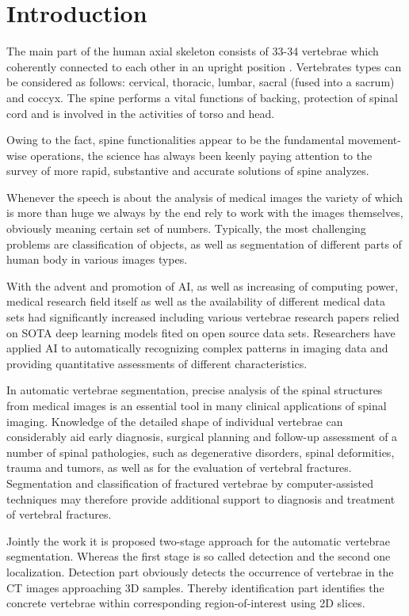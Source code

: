\chapter{Introduction}
\label{ch:introduction}


The main part of the human axial skeleton consists of 33-34 vertebrae which coherently connected to each other in an upright position \cite{Ahlberg2005}. Vertebrates types can be considered as follows: cervical, thoracic, lumbar, sacral (fused into a sacrum) and coccyx. The spine performs a vital functions of backing, protection of spinal cord and is involved in the activities of torso and head.

Owing to the fact, spine functionalities appear to be the fundamental movement-wise operations, the science has always been keenly paying attention to the survey of more rapid, substantive and accurate solutions of spine analyzes.
 
Whenever the speech is about the analysis of medical images the variety of which is more than huge we always by the end rely to work with the images themselves, obviously meaning certain set of numbers. Typically, the most challenging problems are classification of objects, as well as segmentation of different parts of human body in various images types.  
 
With the advent and promotion of AI, as well as increasing of computing power, \cite{Pham2000} medical research field itself as well as the availability of different medical data sets had significantly increased including various vertebrae research papers relied on SOTA deep learning models fited on open source data sets. Researchers have applied AI to automatically recognizing complex patterns in imaging data and providing quantitative assessments of different characteristics.  
 
In automatic vertebrae segmentation, precise analysis of the spinal structures from medical images is an essential tool in many clinical applications of spinal imaging. Knowledge of the detailed shape of individual vertebrae can considerably aid early diagnosis, surgical planning and follow-up assessment of a number of spinal pathologies, such as degenerative disorders, spinal deformities, trauma and tumors, as well as for the evaluation of vertebral fractures. Segmentation and classification of fractured vertebrae by computer-assisted techniques may therefore provide additional support to diagnosis and treatment of vertebral fractures. 

Jointly the work it is proposed two-stage approach for the automatic vertebrae segmentation. Whereas the first stage is so called detection and the second one localization. 
Detection part obviously detects the occurrence of vertebrae in the CT images approaching 3D samples. Thereby identification part identifies the concrete vertebrae within corresponding region-of-interest using 2D slices.